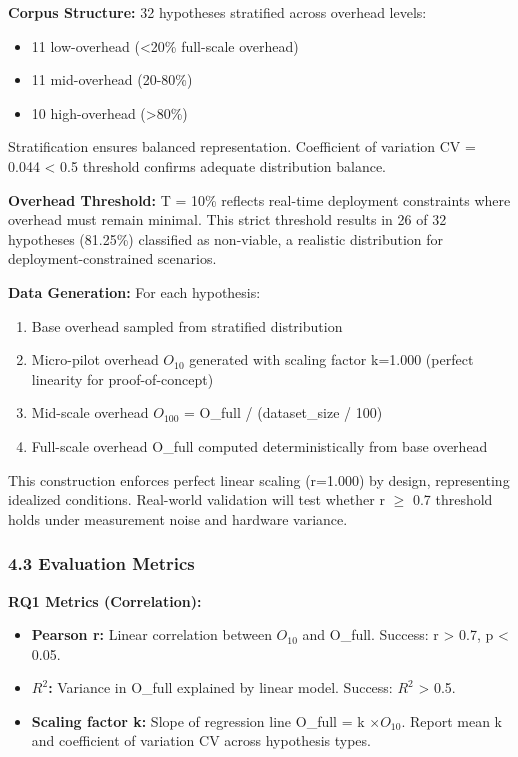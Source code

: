 \textbf{Corpus Structure:} 32 hypotheses stratified across overhead levels:
\begin{itemize}
\item 11 low-overhead (<20\% full-scale overhead)
\item 11 mid-overhead (20-80\%)
\item 10 high-overhead (>80\%)
\end{itemize}

Stratification ensures balanced representation. Coefficient of variation CV = 0.044 < 0.5 threshold confirms adequate distribution balance.

\textbf{Overhead Threshold:} T = 10\% reflects real-time deployment constraints where overhead must remain minimal. This strict threshold results in 26 of 32 hypotheses (81.25\%) classified as non-viable, a realistic distribution for deployment-constrained scenarios.

\textbf{Data Generation:} For each hypothesis:
\begin{enumerate}
\item Base overhead sampled from stratified distribution
\item Micro-pilot overhead $O_{10}$ generated with scaling factor k=1.000 (perfect linearity for proof-of-concept)
\item Mid-scale overhead $O_{100}$ = O\_full / (dataset\_size / 100)
\item Full-scale overhead O\_full computed deterministically from base overhead
\end{enumerate}

This construction enforces perfect linear scaling (r=1.000) by design, representing idealized conditions. Real-world validation will test whether r $\geq$ 0.7 threshold holds under measurement noise and hardware variance.

\subsubsection{4.3 Evaluation Metrics}

\textbf{RQ1 Metrics (Correlation):}
\begin{itemize}
\item \textbf{Pearson r:} Linear correlation between $O_{10}$ and O\_full. Success: r > 0.7, p < 0.05.
\item \textbf{$R^2$:} Variance in O\_full explained by linear model. Success: $R^2$ > 0.5.
\item \textbf{Scaling factor k:} Slope of regression line O\_full = k $\times O_{10}$. Report mean k and coefficient of variation CV across hypothesis types.
\end{itemize}

